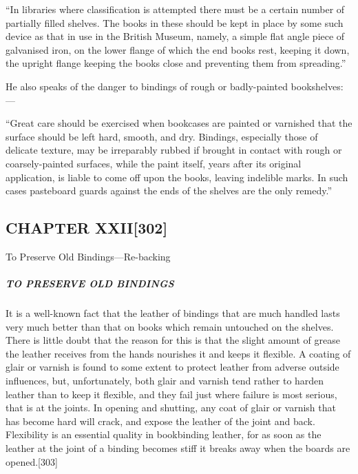 \documentclass[
]{article}
\begin{document}
``In libraries where classification is attempted there must be a certain
number of partially filled shelves. The books in these should be kept in
place by some such device as that in use in the British Museum, namely,
a simple flat angle piece of galvanised iron, on the lower flange of
which the end books rest, keeping it down, the upright flange keeping
the books close and preventing them from spreading.''

He also speaks of the danger to bindings of rough or badly-painted
bookshelves:---

``Great care should be exercised when bookcases are painted or varnished
that the surface should be left hard, smooth, and dry. Bindings,
especially those of delicate texture, may be irreparably rubbed if
brought in contact with rough or coarsely-painted surfaces, while the
paint itself, years after its original application, is liable to come
off upon the books, leaving indelible marks. In such cases pasteboard
guards against the ends of the shelves are the only remedy.''

\hypertarget{chapter-xxii302}{%
\subsection[CHAPTER
XXII]{\texorpdfstring{\protect\hypertarget{CHAPTER_XXII}{}{}CHAPTER
XXII{\protect\hypertarget{Page_302}{}{{[}302{]}}}}{CHAPTER XXII{[}302{]}}}\label{chapter-xxii302}}

To Preserve Old Bindings---Re-backing

\hypertarget{to-preserve-old-bindings}{%
\subparagraph{TO PRESERVE OLD BINDINGS}\label{to-preserve-old-bindings}}

{It} is a well-known fact that the leather of bindings that are much
handled lasts very much better than that on books which remain untouched
on the shelves. There is little doubt that the reason for this is that
the slight amount of grease the leather receives from the hands
nourishes it and keeps it flexible. A coating of glair or varnish is
found to some extent to protect leather from adverse outside influences,
but, unfortunately, both glair and varnish tend rather to harden leather
than to keep it flexible, and they fail just where failure is most
serious, that is at the joints. In opening and shutting, any coat of
glair or varnish that has become hard will crack, and expose the leather
of the joint and back. Flexibility is an essential quality in
bookbinding leather, for as soon as the leather at the joint of a
binding becomes stiff it breaks away when the boards are
opened.{\protect\hypertarget{Page_303}{}{{[}303{]}}}
\end{document}
